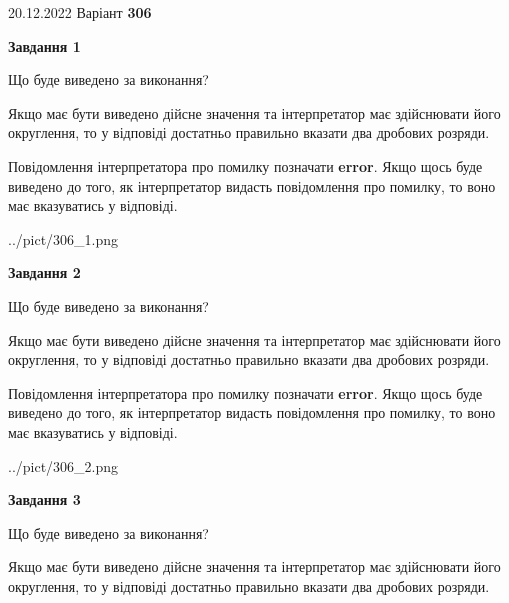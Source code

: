 \documentclass[12pt, ukrainian]{article}
\begin{document}
{20.12.2022 Варіант \No \textbf { 306 }\par}
{
\begin {Large}

{\begin {center}\textbf{Завдання 1}\end {center}}\par
Що буде виведено за виконання? \par

Якщо має бути виведено дійсне значення та інтерпретатор має здійснювати його округлення, 
то у відповіді достатньо правильно вказати два дробових розряди.

Повідомлення інтерпретатора про помилку позначати \textbf{error}.
Якщо щось буде виведено до того, як інтерпретатор видасть повідомлення про помилку, 
то воно має вказуватись у відповіді. \par

\begin{center}
	{../pict/306_1.png}
\end{center}
\newpage

{\begin {center}\textbf{Завдання 2}\end {center}}\par
Що буде виведено за виконання? \par

Якщо має бути виведено дійсне значення та інтерпретатор має здійснювати його округлення, 
то у відповіді достатньо правильно вказати два дробових розряди.

Повідомлення інтерпретатора про помилку позначати \textbf{error}.
Якщо щось буде виведено до того, як інтерпретатор видасть повідомлення про помилку, 
то воно має вказуватись у відповіді. \par

\begin{center}
	{../pict/306_2.png}
\end{center}
\newpage

{\begin {center}\textbf{Завдання 3}\end {center}}\par
Що буде виведено за виконання? \par

Якщо має бути виведено дійсне значення та інтерпретатор має здійснювати його округлення, 
то у відповіді достатньо правильно вказати два дробових розряди.


\end{Large}}
\end{document}
